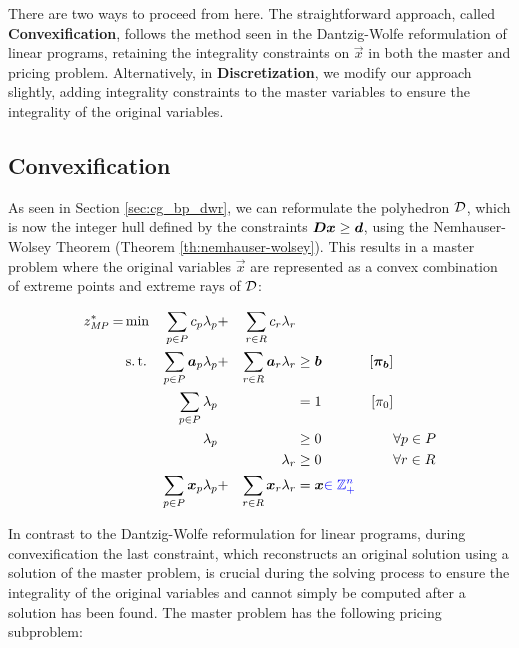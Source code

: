 There are two ways to proceed from here. The straightforward approach, called \textbf{Convexification}, follows the method seen in the Dantzig-Wolfe reformulation of linear programs, retaining the integrality constraints on $\vec{x}$ in both the master and pricing problem. Alternatively, in \textbf{Discretization}, we modify our approach slightly, adding integrality constraints to the master variables to ensure the integrality of the original variables.

\subsection{Convexification}\label{sec:cg_bp_ip_convexification}
As seen in Section \ref{sec:cg_bp_dwr}, we can reformulate the polyhedron $\mathcal{D}$, which is now the integer hull defined by the constraints ${\bm{D}} {\bm{x}} \geq {\bm{d}}$, using the Nemhauser-Wolsey Theorem (Theorem \ref{th:nemhauser-wolsey}). This results in a master problem where the original variables $\vec{x}$ are represented as a convex combination of extreme points and extreme rays of $\mathcal{D}$:

\begin{equation}
\begin{aligned}
z^*_{\textit{MP}}{} = &\min & \sum_{p \in P} c_p \lambda_p &+ &\sum_{r \in R} c_r \lambda_r & & & \\
&\operatorname{s.t.} & \sum_{p \in P} {\bm{a}}_p \lambda_p &+ &\sum_{r \in R} {\bm{a}}_r \lambda_r & \geq {\bm{b}} & \left[{\bm{\pi}}_{\bm{b}}\right] \\
&& \sum_{p \in P} \lambda_p & & & = 1 & \left[\pi_0 \right] & \\
&& \lambda_p & & & \geq 0 & & \forall p \in P \\
&& & & \lambda_r & \geq 0 & & \forall r \in R \\
&& \sum_{p \in P} {\bm{x}}_p \lambda_p &+ &\sum_{r \in R} {\bm{x}}_r \lambda_r & = {\bm{x}} {\color{blue} \in \mathbb{Z}_+^n} & &
\end{aligned}
\end{equation}

In contrast to the Dantzig-Wolfe reformulation for linear programs, during convexification the last constraint, which reconstructs an original solution using a solution of the master problem, is crucial during the solving process to ensure the integrality of the original variables and cannot simply be computed after a solution has been found. The master problem has the following pricing subproblem:

